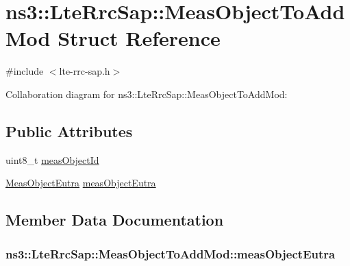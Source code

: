 \hypertarget{structns3_1_1LteRrcSap_1_1MeasObjectToAddMod}{}\section{ns3\+:\+:Lte\+Rrc\+Sap\+:\+:Meas\+Object\+To\+Add\+Mod Struct Reference}
\label{structns3_1_1LteRrcSap_1_1MeasObjectToAddMod}


{\ttfamily \#include $<$lte-\/rrc-\/sap.\+h$>$}



Collaboration diagram for ns3\+:\+:Lte\+Rrc\+Sap\+:\+:Meas\+Object\+To\+Add\+Mod\+:
\subsection*{Public Attributes}
\begin{DoxyCompactItemize}
\item 
uint8\+\_\+t \hyperlink{structns3_1_1LteRrcSap_1_1MeasObjectToAddMod_a74ed90f3f7d58fb7f292244df4f7cdd2}{meas\+Object\+Id}
\item 
\hyperlink{structns3_1_1LteRrcSap_1_1MeasObjectEutra}{Meas\+Object\+Eutra} \hyperlink{structns3_1_1LteRrcSap_1_1MeasObjectToAddMod_a8baa0322c3231b46666da1c60624bcbb}{meas\+Object\+Eutra}
\end{DoxyCompactItemize}


\subsection{Member Data Documentation}
\subsubsection[{\texorpdfstring{meas\+Object\+Eutra}{measObjectEutra}}]{ ns3\+::\+Lte\+Rrc\+Sap\+::\+Meas\+Object\+To\+Add\+Mod\+::meas\+Object\+Eutra}\hypertarget{structns3_1_1LteRrcSap_1_1MeasObjectToAddMod_a8baa0322c3231b46666da1c60624bcbb}{}\label{structns3_1_1LteRrcSap_1_1MeasObjectToAddMod_a8baa0322c3231b46666da1c60624bcbb}
